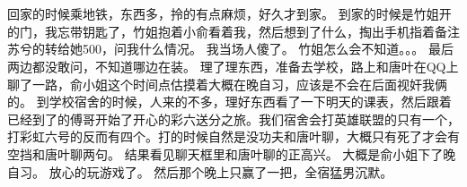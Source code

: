 \chapter{}
回家的时候乘地铁，东西多，拎的有点麻烦，好久才到家。
到家的时候是竹姐开的门，我忘带钥匙了，竹姐抱着小俞看着我，然后想到了什么，掏出手机指着备注苏兮的转给她500，问我什么情况。
我当场人傻了。
竹姐怎么会不知道。。。
最后两边都没敢问，不知道哪边在装。
理了理东西，准备去学校，路上和唐叶在QQ上聊了一路，俞小姐这个时间点估摸着大概在晚自习，应该是不会在后面视奸我俩的。
到学校宿舍的时候，人来的不多，理好东西看了一下明天的课表，然后跟着已经到了的傅哥开始了开心的彩六送分之旅。我们宿舍会打英雄联盟的只有一个，打彩虹六号的反而有四个。打的时候自然是没功夫和唐叶聊，大概只有死了才会有空挡和唐叶聊两句。
结果看见聊天框里和唐叶聊的正高兴。
大概是俞小姐下了晚自习。
放心的玩游戏了。
然后那个晚上只赢了一把，全宿猛男沉默。

